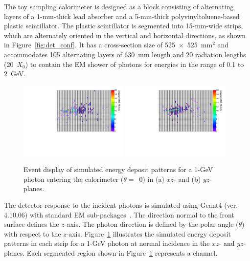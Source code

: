 \documentclass[12pt,times,draftclsnofoot,a4paper]{elsarticle}
\begin{document}
The toy sampling calorimeter is designed as a block consisting of alternating layers of a 1-mm-thick lead absorber and a 5-mm-thick polyvinyltoluene-based plastic scintillator. The plastic scintillator is segmented into 15-mm-wide strips, which are alternately oriented in the vertical and horizontal directions, as shown in Figure~\ref{fig:det_conf}. It has a cross-section size of 525~$\times$~525~mm$^{2}$ and accommodates 105 alternating layers of 630~mm length and 20 radiation lengths (20~$X_{0}$) to contain the EM shower of photons for energies in the range of 0.1 to 2~GeV.

\begin{figure}[!hbt]
\centering
\includegraphics[width=0.48\textwidth]{Fig2_EMShower_XZ.pdf}
\includegraphics[width=0.48\textwidth]{Fig2_EMShower_YZ.pdf}
\caption{ Event display of simulated energy deposit patterns for a 1-GeV photon entering the calorimeter ($\theta=$~0) in (a) $xz$- and (b) $yz$-planes.}
\label{fig:Evt_Dis}
\end{figure}

The detector response to the incident photons is simulated using Geant4 (ver. 4.10.06) with standard EM sub-packages~\cite{GEANT4}. The direction normal to the front surface defines the $z$-axis. The photon direction is defined by the polar angle ($\theta$) with respect to the $z$-axis. Figure~\ref{fig:Evt_Dis} illustrates the simulated energy deposit patterns in each strip for a 1-GeV photon at normal incidence in the $xz$- and $yz$-planes. Each segmented region shown in Figure~\ref{fig:Evt_Dis} represents a channel. 
\end{document}
